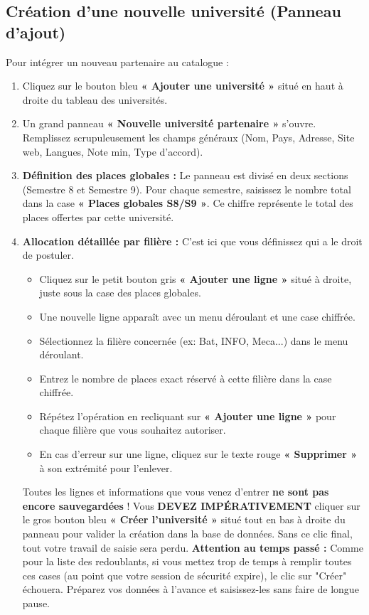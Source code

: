 \documentclass[12pt,a4paper]{article}
\begin{document}
\subsection{Création d'une nouvelle université (Panneau d'ajout)}
Pour intégrer un nouveau partenaire au catalogue :
\begin{enumerate}
    \item Cliquez sur le bouton bleu \textbf{« Ajouter une université »} situé en haut à droite du tableau des universités.
    \item Un grand panneau \textbf{« Nouvelle université partenaire »} s'ouvre. Remplissez scrupuleusement les champs généraux (Nom, Pays, Adresse, Site web, Langues, Note min, Type d'accord).
    \item \textbf{Définition des places globales :} Le panneau est divisé en deux sections (Semestre 8 et Semestre 9). Pour chaque semestre, saisissez le nombre total dans la case \textbf{« Places globales S8/S9 »}. Ce chiffre représente le total des places offertes par cette université.
    \item \textbf{Allocation détaillée par filière :} C'est ici que vous définissez qui a le droit de postuler.
    \begin{itemize}[leftmargin=*]
        \item Cliquez sur le petit bouton gris \textbf{« Ajouter une ligne »} situé à droite, juste sous la case des places globales.
        \item Une nouvelle ligne apparaît avec un menu déroulant et une case chiffrée.
        \item Sélectionnez la filière concernée (ex: Bat, INFO, Meca...) dans le menu déroulant.
        \item Entrez le nombre de places exact réservé à cette filière dans la case chiffrée.
        \item Répétez l'opération en recliquant sur \textbf{« Ajouter une ligne »} pour chaque filière que vous souhaitez autoriser.
        \item En cas d'erreur sur une ligne, cliquez sur le texte rouge \textbf{« Supprimer »} à son extrémité pour l'enlever.
    \end{itemize}
    \begin{tcolorbox}[colback=red!5!white,colframe=red!75!black,title=⚠️ VALIDATION FINALE OBLIGATOIRE ET RISQUE D'EXPIRATION]
    Toutes les lignes et informations que vous venez d'entrer \textbf{ne sont pas encore sauvegardées} ! Vous \textbf{DEVEZ IMPÉRATIVEMENT} cliquer sur le gros bouton bleu \textbf{« Créer l'université »} situé tout en bas à droite du panneau pour valider la création dans la base de données. Sans ce clic final, tout votre travail de saisie sera perdu.
    \newline \textbf{Attention au temps passé :} Comme pour la liste des redoublants, si vous mettez trop de temps à remplir toutes ces cases (au point que votre session de sécurité expire), le clic sur "Créer" échouera. Préparez vos données à l'avance et saisissez-les sans faire de longue pause.
    \end{tcolorbox}
\end{enumerate}
\end{document}
